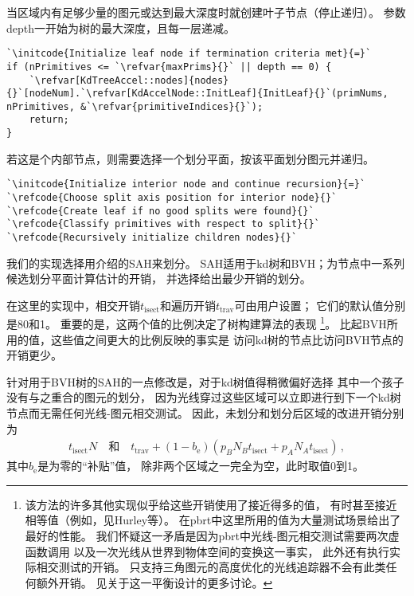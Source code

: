 当区域内有足够少量的图元或达到最大深度时就创建叶子节点（停止递归）。
参数{\ttfamily depth}一开始为树的最大深度，且每一层递减。
\begin{lstlisting}
`\initcode{Initialize leaf node if termination criteria met}{=}`
if (nPrimitives <= `\refvar{maxPrims}{}` || depth == 0) {
    `\refvar[KdTreeAccel::nodes]{nodes}{}`[nodeNum].`\refvar[KdAccelNode::InitLeaf]{InitLeaf}{}`(primNums, nPrimitives, &`\refvar{primitiveIndices}{}`);
    return;
}
\end{lstlisting}

若这是个内部节点，则需要选择一个划分平面，按该平面划分图元并递归。
\begin{lstlisting}
`\initcode{Initialize interior node and continue recursion}{=}`
`\refcode{Choose split axis position for interior node}{}`
`\refcode{Create leaf if no good splits were found}{}`
`\refcode{Classify primitives with respect to split}{}`
`\refcode{Recursively initialize children nodes}{}`
\end{lstlisting}

我们的实现选择用介绍的SAH来划分。
SAH适用于kd树和BVH；为节点中一系列候选划分平面计算估计的开销，
并选择给出最少开销的划分。

在这里的实现中，相交开销$t_{\text{isect}}$和遍历开销$t_{\text{trav}}$可由用户设置；
它们的默认值分别是80和1。
重要的是，这两个值的比例决定了树构建算法的表现
\footnote{该方法的许多其他实现似乎给这些开销使用了接近得多的值，
    有时甚至接近相等值（例如，见Hurley等\parencite*{hurley2002fast}）。
    在pbrt中这里所用的值为大量测试场景给出了最好的性能。
    我们怀疑这一矛盾是因为pbrt中光线-图元相交测试需要两次虚函数调用
    以及一次光线从世界到物体空间的变换这一事实，
    此外还有执行实际相交测试的开销。
    只支持三角图元的高度优化的光线追踪器不会有此类任何额外开销。
    见关于这一平衡设计的更多讨论。}。
比起BVH所用的值，这些值之间更大的比例反映的事实是
访问kd树的节点比访问BVH节点的开销更少。

针对用于BVH树的SAH的一点修改是，对于kd树值得稍微偏好选择
其中一个孩子没有与之重合的图元的划分，
因为光线穿过这些区域可以立即进行到下一个kd树节点而无需任何光线-图元相交测试。
因此，未划分和划分后区域的改进开销分别为
\begin{align*}
    t_{\text{isect}}N \quad \text{和} \quad t_{\text{trav}}+(1-b_{\mathrm{e}})(p_BN_Bt_{\text{isect}}+p_AN_At_{\text{isect}})\, ,
\end{align*}
其中$b_{\mathrm{e}}$是为零的“补贴”值，
除非两个区域之一完全为空，此时取值0到1。

